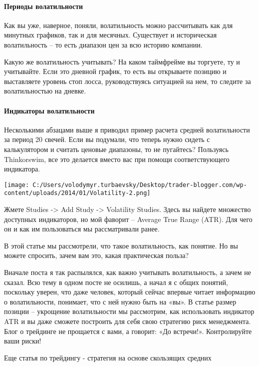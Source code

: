 \documentclass[a5paper]{article}
\begin{document}
\paragraph{Периоды волатильности}

Как вы уже, наверное, поняли, волатильность можно рассчитывать как для минутных графиков, так и для месячных. Существует и историческая волатильность – то есть диапазон цен за всю историю компании.

Какую же волатильность учитывать? На каком таймфрейме вы торгуете, ту
и учитывайте. Если это дневной график, то есть вы открываете позицию и
выставляете уровень стоп лосса, руководствуясь ситуацией на нем, то
следите за волатильностью на дневке.

\paragraph{Индикаторы волатильности}

Несколькими абзацами выше я приводил пример расчета средней
волатильности за период 20 свечей. Если вы подумали, что теперь нужно
сидеть с калькулятором и считать ценовые диапазоны, то не пугайтесь?
Пользуясь Thinkorswim, все это делается вместо вас при помощи
соответствующего индикатора.

\texttt{[image: C:/Users/volodymyr.turbaevsky/Desktop/trader-blogger.com/wp-content/uploads/2014/01/Volatility-2.png]}

Жмете Studies -> Add Study -> Volatility Studies. Здесь вы найдете множество доступных индикаторов, но мой фаворит – Average True Range (ATR). Для чего он и как им пользоваться мы рассматривали ранее.

В этой статье мы рассмотрели, что такое волатильность, как понятие. Но вы можете спросить, зачем вам это, какая практическая польза?

Вначале поста я так распылялся, как важно учитывать волатильность, а зачем не сказал. Всю тему в одном посте не осилишь, а начал я с общих понятий, поскольку уверен, что даже человек, который сейчас впервые читает информацию о волатильности, понимает, что с ней нужно быть на «вы». В статье размер позиции – укрощение волатильности мы рассмотрим, как использовать индикатор ATR и вы даже сможете построить для себя свою стратегию риск менеджмента. Блог о трейдинге не прощается с вами, а говорит: «До встречи!». Контролируйте ваши риски!


Еще статья по трейдингу - стратегия на основе скользящих средних
\end{document}
